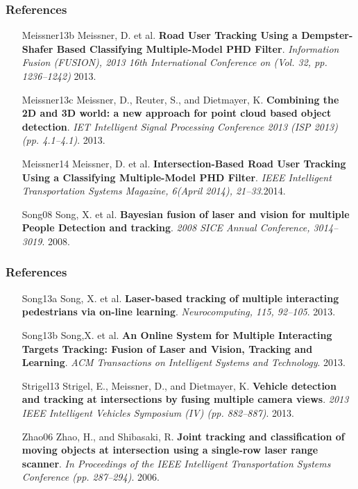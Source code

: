 \documentclass[table]{beamer}
\begin{document}
\frame
{
	\frametitle{References}
		\footnotesize{
	\begin{itemize}[leftmargin=.6in]
		\item [Meissner13b] Meissner, D. et al. \textbf{Road User Tracking Using a Dempster-Shafer Based Classifying Multiple-Model PHD Filter}. \textit{Information Fusion (FUSION), 2013 16th International Conference on (Vol. 32, pp. 1236–1242)} 2013.
		\item [Meissner13c] Meissner, D., Reuter, S., and Dietmayer, K. \textbf{Combining the 2D and 3D world: a new approach for point cloud based object detection}. \textit{IET Intelligent Signal Processing Conference 2013 (ISP 2013) (pp. 4.1–4.1)}. 2013.
		\item [Meissner14] Meissner, D. et al. \textbf{Intersection-Based Road User Tracking Using a Classifying Multiple-Model PHD Filter}.\textit{ IEEE Intelligent Transportation Systems Magazine, 6(April 2014), 21–33}.2014.
		\item [Song08] Song, X. et al. \textbf{Bayesian fusion of laser and vision for multiple People Detection and tracking}. \textit{2008 SICE Annual Conference, 3014–3019}. 2008.		
	\end{itemize}	
	}
}

\frame
{
	\frametitle{References}
		\footnotesize{
	\begin{itemize}[leftmargin=.6in]
		\item [Song13a] Song, X. et al. \textbf{Laser-based tracking of multiple interacting pedestrians via on-line learning}. \textit{Neurocomputing, 115, 92–105}. 2013.
		\item [Song13b] Song,X. et al. \textbf{An Online System for Multiple Interacting Targets Tracking: Fusion of Laser and Vision, Tracking and Learning}. \textit{ACM Transactions on Intelligent Systems and Technology}. 2013.
		\item [Strigel13] Strigel, E., Meissner, D., and Dietmayer, K. \textbf{Vehicle detection and tracking at intersections by fusing multiple camera views}. \textit{2013 IEEE Intelligent Vehicles Symposium (IV) (pp. 882–887)}. 2013.
		\item [Zhao06] Zhao, H., and Shibasaki, R. \textbf{Joint tracking and classification of moving objects at intersection using a single-row laser range scanner}. \textit{In Proceedings of the IEEE Intelligent Transportation Systems Conference (pp. 287–294)}. 2006.
	\end{itemize}	
	}
}
\end{document}
